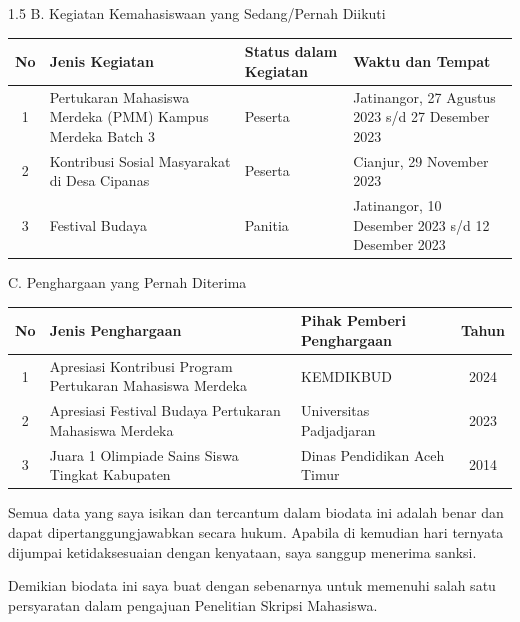 \documentclass[12pt, a4paper, onecolumn, oneside]{report}
\begin{document}
\begin{spacing}{1.5}
\vspace{0.2cm}
\noindent B. Kegiatan Kemahasiswaan yang Sedang/Pernah Diikuti

\vspace{0.1cm}
\begin{tabular}{|c|>{\raggedright\arraybackslash}p{4.5cm}|>{\raggedright\arraybackslash}p{3.0cm}|>{\raggedright\arraybackslash}p{4.5cm}|}
\hline
\rowcolor{lightgray}No & Jenis Kegiatan & Status dalam Kegiatan & Waktu dan Tempat \\
\hline
1 & Pertukaran Mahasiswa Merdeka (PMM) Kampus Merdeka Batch 3 & Peserta & Jatinangor, 27 Agustus 2023 s/d 27 Desember 2023 \\
\hline
2 & Kontribusi Sosial Masyarakat di Desa Cipanas & Peserta & Cianjur, 29 November 2023 \\
\hline
3 & Festival Budaya & Panitia & Jatinangor, 10 Desember 2023 s/d 12 Desember 2023 \\
\hline
\end{tabular}

\vspace{0.2cm}
\noindent C. Penghargaan yang Pernah Diterima

\vspace{0.1cm}
\begin{tabular}{|c|>{\raggedright\arraybackslash}p{6.5cm}|>{\raggedright\arraybackslash}p{4.0cm}|c|}
\hline
\rowcolor{lightgray}No & Jenis Penghargaan & Pihak Pemberi Penghargaan & Tahun \\
\hline
1 & Apresiasi Kontribusi Program Pertukaran Mahasiswa Merdeka & KEMDIKBUD & 2024 \\
\hline
2 & Apresiasi Festival Budaya Pertukaran Mahasiswa Merdeka & Universitas Padjadjaran & 2023 \\
\hline
3 & Juara 1 Olimpiade Sains Siswa Tingkat Kabupaten & Dinas Pendidikan Aceh Timur & 2014 \\
\hline
\end{tabular}

\vspace{0.3cm}
\hspace{1cm} Semua data yang saya isikan dan tercantum dalam biodata ini adalah benar dan dapat dipertanggungjawabkan secara hukum. Apabila di kemudian hari ternyata dijumpai ketidaksesuaian dengan kenyataan, saya sanggup menerima sanksi.

\hspace{1cm} Demikian biodata ini saya buat dengan sebenarnya untuk memenuhi salah satu persyaratan dalam pengajuan Penelitian Skripsi Mahasiswa.


\end{spacing}
\end{document}
